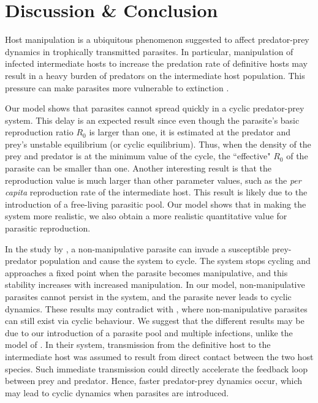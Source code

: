 \documentclass[a4paper]{scrartcl}
\begin{document}
\section*{Discussion \& Conclusion}
Host manipulation is a ubiquitous phenomenon suggested to affect predator-prey dynamics in trophically transmitted parasites. 
In particular, manipulation of infected intermediate hosts to increase the predation rate of definitive hosts may result in a heavy burden of predators on the intermediate host population.
This pressure can make parasites more vulnerable to extinction \citep{Hadeler1989,Fenton2006}. 

Our model shows that parasites cannot spread quickly in a cyclic predator-prey system. 
This delay is an expected result since even though the parasite's basic reproduction ratio $R_0$ is larger than one, it is estimated at the predator and prey's unstable equilibrium (or cyclic equilibrium). 
Thus, when the density of the prey and predator is at the minimum value of the cycle, the ``effective" $R_0$ of the parasite can be smaller than one. 
Another interesting result is that the reproduction value is much larger than other parameter values, such as the \textit{per capita} reproduction rate of the intermediate host.
This result is likely due to the introduction of a free-living parasitic pool. Our model shows that in making the system more realistic, we also obtain a more realistic quantitative value for parasitic reproduction.

In the study by \cite{Rogawa2018}, a non-manipulative parasite can invade a susceptible prey-predator population and cause the system to cycle. 
The system stops cycling and approaches a fixed point when the parasite becomes manipulative, and this stability increases with increased manipulation.
In our model, non-manipulative parasites cannot persist in the system, and the parasite never leads to cyclic dynamics. 
These results may contradict with \cite{Rogawa2018}, where non-manipulative parasites can still exist via cyclic behaviour. 
We suggest that the different results may be due to our introduction of a parasite pool and multiple infections, unlike the model of \cite{Rogawa2018}. 
In their system, transmission from the definitive host to the intermediate host was assumed to result from direct contact between the two host species. 
Such immediate transmission could directly accelerate the feedback loop between prey and predator. 
Hence, faster predator-prey dynamics occur, which may lead to cyclic dynamics when parasites are introduced.
\end{document}
